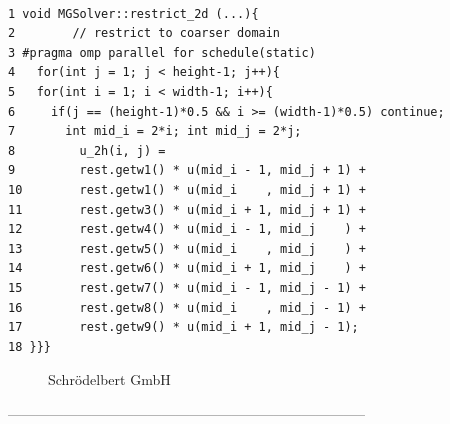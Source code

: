 \documentclass{beamer}
\begin{document}
 \begin{lstlisting}

1 void MGSolver::restrict_2d (...){
2        // restrict to coarser domain
3 #pragma omp parallel for schedule(static)
4   for(int j = 1; j < height-1; j++){
5   for(int i = 1; i < width-1; i++){
6     if(j == (height-1)*0.5 && i >= (width-1)*0.5) continue;
7       int mid_i = 2*i; int mid_j = 2*j;
8         u_2h(i, j) = 
9         rest.getw1() * u(mid_i - 1, mid_j + 1) +
10        rest.getw1() * u(mid_i    , mid_j + 1) +
11        rest.getw3() * u(mid_i + 1, mid_j + 1) +
12        rest.getw4() * u(mid_i - 1, mid_j    ) +
13        rest.getw5() * u(mid_i    , mid_j    ) +
14        rest.getw6() * u(mid_i + 1, mid_j    ) +
15        rest.getw7() * u(mid_i - 1, mid_j - 1) +
16        rest.getw8() * u(mid_i    , mid_j - 1) +
17        rest.getw9() * u(mid_i + 1, mid_j - 1); 
18 }}}
\end{lstlisting}

\begin{figure}[h]
\centering
\caption{Schrödelbert GmbH}
\end{figure}



-----------------------------------------------------------------------------
\end{document}
